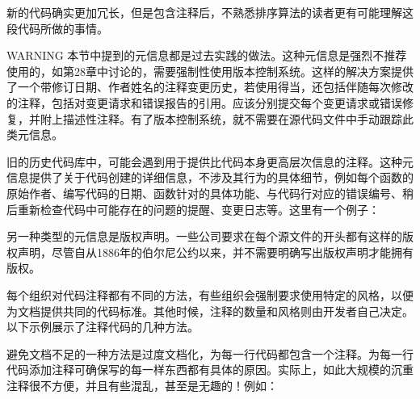 新的代码确实更加冗长，但是包含注释后，不熟悉排序算法的读者更有可能理解这段代码所做的事情。


\begin{myWarning}{WARNING}
本节中提到的元信息都是过去实践的做法。这种元信息是强烈不推荐使用的，如第28章中讨论的，需要强制性使用版本控制系统。这样的解决方案提供了一个带修订日期、作者姓名的注释变更历史，若使用得当，还包括伴随每次修改的注释，包括对变更请求和错误报告的引用。应该分别提交每个变更请求或错误修复，并附上描述性注释。有了版本控制系统，就不需要在源代码文件中手动跟踪此类元信息。
\end{myWarning}

旧的历史代码库中，可能会遇到用于提供比代码本身更高层次信息的注释。这种元信息提供了关于代码创建的详细信息，不涉及其行为的具体细节，例如每个函数的原始作者、编写代码的日期、函数针对的具体功能、与代码行对应的错误编号、稍后重新检查代码中可能存在的问题的提醒、变更日志等。这里有一个例子：



另一种类型的元信息是版权声明。一些公司要求在每个源文件的开头都有这样的版权声明，尽管自从1886年的伯尔尼公约以来，并不需要明确写出版权声明才能拥有版权。


每个组织对代码注释都有不同的方法，有些组织会强制要求使用特定的风格，以便为文档提供共同的代码标准。其他时候，注释的数量和风格则由开发者自己决定。以下示例展示了注释代码的几种方法。


避免文档不足的一种方法是过度文档化，为每一行代码都包含一个注释。为每一行代码添加注释可确保写的每一样东西都有具体的原因。实际上，如此大规模的沉重注释很不方便，并且有些混乱，甚至是无趣的！例如：

